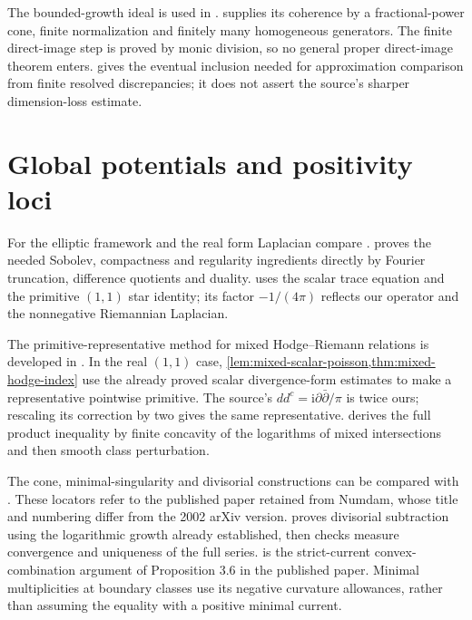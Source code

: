 The bounded-growth ideal is used in \cite[Chapter on plurisubharmonic functions, the lemma following the definition of $\mathcal I_\infty$ and Lemma \texttt{IandIinf}]{XiaSampleBook}.  supplies its coherence by a fractional-power cone, finite normalization and finitely many homogeneous generators. The finite direct-image step is proved by monic division, so no general proper direct-image theorem enters.  gives the eventual inclusion needed for approximation comparison from finite resolved discrepancies; it does not assert the source's sharper dimension-loss estimate.

\section{Global potentials and positivity loci}
\label{sec:history-global-potentials}
For the elliptic framework and the real form Laplacian compare \cite[Chapter VI, Section 2, pp.~289--290, and Sections 3.1--3.2, pp.~291--294]{DemBook}.  proves the needed Sobolev, compactness and regularity ingredients directly by Fourier truncation, difference quotients and duality.  uses the scalar trace equation and the primitive $(1,1)$ star identity; its factor $-1/(4\pi)$ reflects our operator and the nonnegative Riemannian Laplacian.

The primitive-representative method for mixed Hodge--Riemann relations is developed in \cite[Propositions 2.3--2.4 and proof of Theorem A, pp.~5--8]{DN2005mixedv2}. In the real $(1,1)$ case, \cref{lem:mixed-scalar-poisson,thm:mixed-hodge-index} use the already proved scalar divergence-form estimates to make a representative pointwise primitive. The source's $dd^c=\mathrm{i}\partial\bar\partial/\pi$ is twice ours; rescaling its correction by two gives the same representative.  derives the full product inequality by finite concavity of the logarithms of mixed intersections and then smooth class perturbation.


The cone, minimal-singularity and divisorial constructions can be compared with \cite[Sections 2.1--2.3, pp.~47--49, Sections 2.7--2.8, pp.~51--53, and Section 3.1, pp.~54--55]{Bou04}. These locators refer to the published paper retained from Numdam, whose title and numbering differ from the 2002 arXiv version.  proves divisorial subtraction using the logarithmic growth already established, then checks measure convergence and uniqueness of the full series.  is the strict-current convex-combination argument of Proposition 3.6 in the published paper. Minimal multiplicities at boundary classes use its negative curvature allowances, rather than assuming the equality with a positive minimal current.

